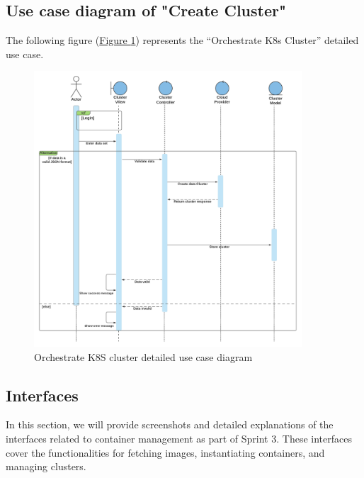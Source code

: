 \subsection{Use case diagram of "Create Cluster"}

The following figure (\hyperref[fig:sequenece-cluster]{Figure \ref{fig:sequenece-cluster}})  represents the ``Orchestrate \ac{K8s} Cluster'' detailed use case.
\begin{figure}[h]
  \center
  \includegraphics[width=10cm]{./chapters/sprint3/sequenece-cluster.png}
  \caption{Orchestrate K8S cluster detailed use case diagram}
  \label{fig:sequenece-cluster}
\end{figure}

\subsection{Interfaces}
In this section, we will provide screenshots and detailed explanations of the interfaces related to container management as part of Sprint 3. These interfaces cover the functionalities for fetching images, instantiating containers, and managing clusters.

